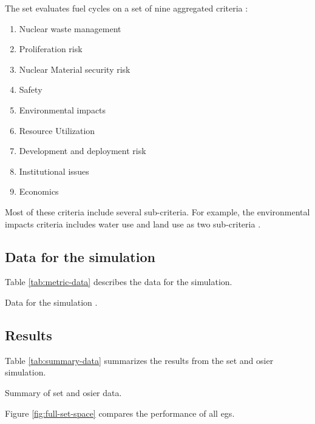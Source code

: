The \ac{set} evaluates fuel cycles on a set of nine aggregated criteria \cite{wigeland_nuclear_2014}:
\begin{enumerate}
    \item Nuclear waste management
    \item Proliferation risk
    \item Nuclear Material security risk
    \item Safety
    \item Environmental impacts
    \item Resource Utilization
    \item Development and deployment risk
    \item Institutional issues
    \item Economics
\end{enumerate}

Most of these criteria include several sub-criteria. For example, the environmental impacts criteria 
includes water use and land use as two sub-criteria \cite{wigeland_nuclear_2014-1}.

\subsection{Data for the simulation}

Table \ref{tab:metric-data} describes the data for the simulation.

\begin{sidewaystable}[ht!]
    \centering
    \caption{Data for the simulation \cite{wigeland_nuclear_2014-1}.}
    \label{tab:metric-data}
    \resizebox*{\textwidth}{!}{}
\end{sidewaystable}

\subsection{Results}

Table \ref{tab:summary-data} summarizes the results from the \ac{set} and \ac{osier} simulation.

\begin{table}[ht!]
    \centering
    \caption{Summary of \ac{set} and \ac{osier} data.}
    \label{tab:summary-data}
    \resizebox*{0.75\textwidth}{!}{}
\end{table}


Figure \ref{fig:full-set-space} compares the performance of all \acp{eg}.

